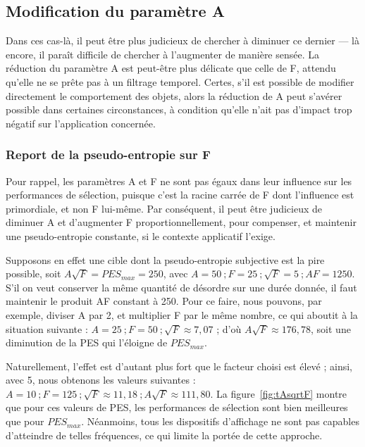 	\subsection{Modification du paramètre A}
	Dans ces cas-là, il peut être plus judicieux de chercher à diminuer ce dernier --- là encore, il paraît difficile de chercher à l'augmenter de manière sensée. La réduction du paramètre A est peut-être plus délicate que celle de F, attendu qu'elle ne se prête pas à un filtrage temporel. Certes, s'il est possible de modifier directement le comportement des objets, alors la réduction de A peut s'avérer possible dans certaines circonstances, à condition qu'elle n'ait pas d'impact trop négatif sur l'application concernée.
	
	\subsubsection{Report de la pseudo-entropie sur F}
	Pour rappel, les paramètres A et F ne sont pas égaux dans leur influence sur les performances de sélection, puisque c'est la racine carrée de F dont l'influence est primordiale, et non F lui-même. Par conséquent, il peut être judicieux de diminuer A et d'augmenter F proportionnellement, pour compenser, et maintenir une pseudo-entropie constante, si le contexte applicatif l'exige.
	
	Supposons en effet une cible dont la pseudo-entropie subjective est la \og pire \fg{} possible, soit $A\sqrt{F} = PES_{max} = 250$, avec $A = 50~; F = 25~; \sqrt{F} = 5~; AF = 1250$. S'il on veut conserver la même quantité de désordre sur une durée donnée, il faut maintenir le produit AF constant à 250. Pour ce faire, nous pouvons, par exemple, diviser A par 2, et multiplier F par le même nombre, ce qui aboutit à la situation suivante : $A = 25~; F = 50~; \sqrt{F} \approx 7,07$ ; d'où $A\sqrt{F} \approx 176,78$, soit une diminution de la PES qui l'éloigne de $PES_{max}$.
	
	Naturellement, l'effet est d'autant plus fort que le facteur choisi est élevé ; ainsi, avec 5, nous obtenons les valeurs suivantes : $A = 10~; F = 125~; \sqrt{F} \approx 11,18~; A\sqrt{F} \approx 111,80$. La figure~\ref{fig:tAsqrtF} montre que pour ces valeurs de PES, les performances de sélection sont bien meilleures que pour $PES_{max}$. Néanmoins, tous les dispositifs d'affichage ne sont pas capables d'atteindre de telles fréquences, ce qui limite la portée de cette approche.
	
